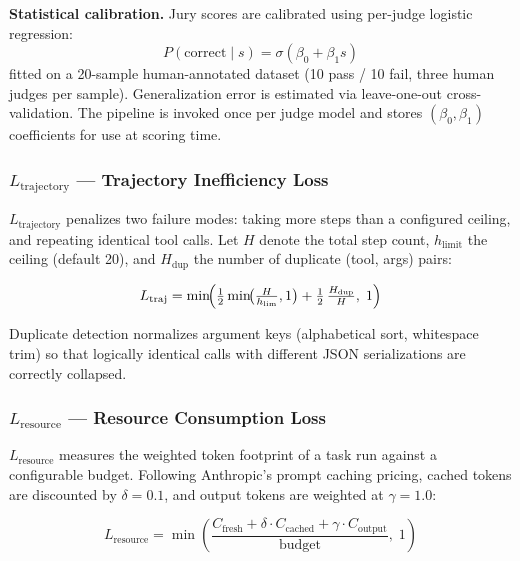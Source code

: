 \noindent\textbf{Statistical calibration.}  Jury scores are calibrated using
per-judge logistic regression:
\begin{equation}
P(\text{correct} \mid s) = \sigma(\beta_0 + \beta_1 s)
\label{eq:calibration}
\end{equation}
fitted on a 20-sample human-annotated dataset (10 pass / 10 fail, three human
judges per sample).  Generalization error is estimated via leave-one-out
cross-validation.  The pipeline is invoked once per judge model and stores
$(\beta_0, \beta_1)$ coefficients for use at scoring time.

\subsubsection*{$L_\text{trajectory}$ --- Trajectory Inefficiency Loss}

$L_\text{trajectory}$ penalizes two failure modes: taking more steps than a
configured ceiling, and repeating identical tool calls.  Let $H$ denote the
total step count, $h_\text{limit}$ the ceiling (default 20), and
$H_\text{dup}$ the number of duplicate (tool, args) pairs:

\begin{equation}
L_\text{traj} = \min\!\Bigl(
  \tfrac{1}{2}\min\!\bigl(\tfrac{H}{h_\text{lim}},1\bigr)
  + \tfrac{1}{2}\,\tfrac{H_\text{dup}}{H},\;1
\Bigr)
\label{eq:ltraj}
\end{equation}

Duplicate detection normalizes argument keys (alphabetical sort, whitespace
trim) so that logically identical calls with different JSON serializations are
correctly collapsed.

\subsubsection*{$L_\text{resource}$ --- Resource Consumption Loss}

$L_\text{resource}$ measures the weighted token footprint of a task run
against a configurable budget.  Following Anthropic's prompt caching pricing,
cached tokens are discounted by $\delta = 0.1$, and output tokens are weighted
at $\gamma = 1.0$:

\begin{equation}
L_\text{resource} = \min\!\left(
  \frac{C_\text{fresh} + \delta \cdot C_\text{cached} + \gamma \cdot C_\text{output}}
       {\text{budget}},\; 1
\right)
\label{eq:lresource}
\end{equation}

